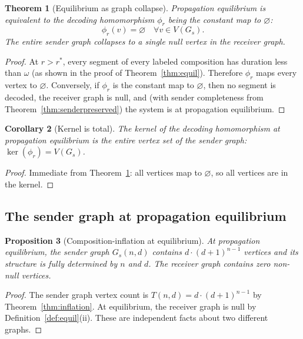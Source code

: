 \documentclass[twocolumn,11pt,a4paper]{article}
\theoremstyle{main}
\newtheorem{theorem}{Theorem}[section]
\newtheorem{proposition}[theorem]{Proposition}
\newtheorem{corollary}[theorem]{Corollary}
\theoremstyle{definition}
\theoremstyle{remark}
\newcommand{\Traj}{T}
\newcommand{\rate}{r}
\newcommand{\window}{\omega}
\begin{document}
\begin{theorem}[Equilibrium as graph collapse]
\label{thm:collapse}
Propagation equilibrium is equivalent to the decoding homomorphism
$\phi_{\rate}$ being the constant map to $\varnothing$:
\[
  \phi_\rate(v) = \varnothing \quad \forall v \in V(G_s).
\]
The entire sender graph collapses to a single null vertex in the receiver
graph.
\end{theorem}

\begin{proof}
At $\rate > \rate^*$, every segment of every labeled composition has
duration less than $\window$ (as shown in the proof of
Theorem~\ref{thm:equil}). Therefore $\phi_\rate$ maps every vertex to
$\varnothing$. Conversely, if $\phi_\rate$ is the constant map to
$\varnothing$, then no segment is decoded, the receiver graph is null,
and (with sender completeness from Theorem~\ref{thm:senderpreserved})
the system is at propagation equilibrium.
\end{proof}

\begin{corollary}[Kernel is total]
\label{cor:kernel}
The kernel of the decoding homomorphism at propagation equilibrium is the
entire vertex set of the sender graph: $\ker(\phi_{\rate}) = V(G_s)$.
\end{corollary}

\begin{proof}
Immediate from Theorem~\ref{thm:collapse}: all vertices map to
$\varnothing$, so all vertices are in the kernel.
\end{proof}

\subsection{The sender graph at propagation equilibrium}

\begin{proposition}[Composition-inflation at equilibrium]
\label{prop:inflation_equil}
At propagation equilibrium, the sender graph $G_s(n,d)$ contains
$d \cdot (d+1)^{n-1}$ vertices and its structure is fully determined by
$n$ and $d$. The receiver graph contains zero non-null vertices.
\end{proposition}

\begin{proof}
The sender graph vertex count is $\Traj(n,d) = d \cdot (d+1)^{n-1}$
by Theorem~\ref{thm:inflation}. At equilibrium, the receiver graph is
null by Definition~\ref{def:equil}(ii). These are independent facts
about two different graphs.
\end{proof}
\end{document}
